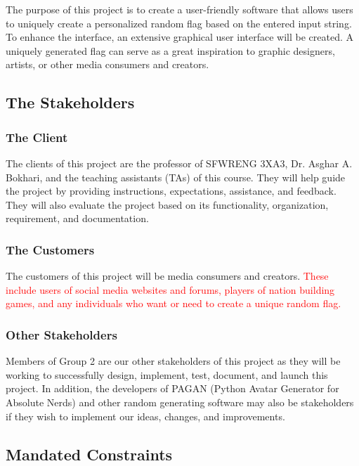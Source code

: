 \documentclass[12pt, titlepage]{article}
\begin{document}
The purpose of this project is to create a user-friendly software that allows users to uniquely create a personalized random flag based on the entered input string. To enhance the interface, an extensive graphical user interface will be created. A uniquely generated flag can serve as a great inspiration to graphic designers, artists, or other media consumers and creators.

\subsection{The Stakeholders}

\subsubsection{The Client}

The clients of this project are the professor of SFWRENG 3XA3, Dr. Asghar A. Bokhari, and the teaching assistants (TAs) of this course. They will help guide the project by providing instructions, expectations, assistance, and feedback. They will also evaluate the project based on its functionality, organization, requirement, and documentation.

\subsubsection{The Customers}

The customers of this project will be media consumers and creators. \textcolor{red}{These include users of social media websites and forums, players of nation building games, and any individuals who want or need to create a unique random flag.}

\subsubsection{Other Stakeholders}

Members of Group 2 are our other stakeholders of this project as they will be working to successfully design, implement, test, document, and launch this project. In addition, the developers of PAGAN (Python Avatar Generator for Absolute Nerds) and other random generating software may also be stakeholders if they wish to implement our ideas, changes, and improvements.

\subsection{Mandated Constraints}
\end{document}
